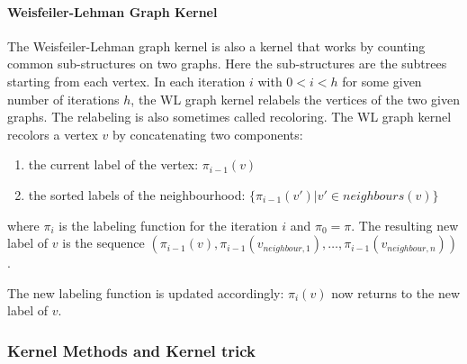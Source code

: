 

\paragraph{Weisfeiler-Lehman Graph Kernel}
The Weisfeiler-Lehman graph kernel is also a kernel that works by counting common sub-structures on two graphs.
Here the sub-structures are the subtrees starting from each vertex.
In each iteration $i$ with $0 < i < h$ for some given number of iterations $h$, the WL graph kernel relabels the vertices of the two given graphs. The relabeling is also sometimes called recoloring.
The WL graph kernel recolors a vertex $v$ by concatenating two components:
\begin{enumerate}
    \item{the current label of the vertex: $\pi_{i-1}(v)$}
    \item{the sorted labels of the neighbourhood: $\{ \pi_{i-1}(v') | v' \in neighbours(v) \}$}
\end{enumerate}
where $\pi_{i}$ is the labeling function for the iteration $i$ and $\pi_0 = \pi$.
The resulting new label of $v$ is the sequence $(\pi_{i-1}(v), \pi_{i-1}(v_{neighbour,1}), \dots , \pi_{i-1}(v_{neighbour,n}))$.


The new labeling function is updated accordingly: $\pi_i(v)$ now returns to the new label of $v$.



\subsubsection{Kernel Methods and Kernel trick}


